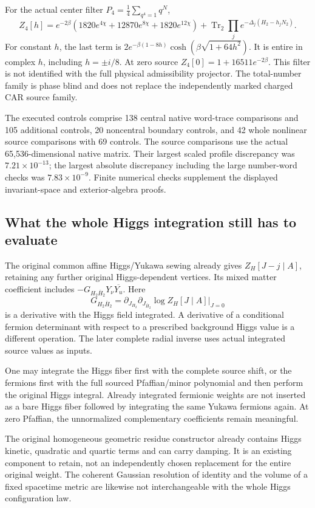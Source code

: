 For the actual center filter \(P_4=\frac14\sum_{q^4=1}q^N\),
\[
 Z_4[h]=e^{-2\beta}\left(1820e^{4\chi}+12870e^{8\chi}
                   +1820e^{12\chi}\right)
       +\operatorname{Tr}_2\prod_j e^{-\Delta_j(H_2-h_jN_2)}.
\]
For constant \(h\), the last term is
\(2e^{-\beta(1-8h)}\cosh(\beta\sqrt{1+64h^2})\).
It is entire in complex \(h\), including \(h=\pm i/8\).
At zero source \(Z_4[0]=1+16511e^{-2\beta}\).
This filter is not identified with the full physical admissibility
projector. The total-number family is phase blind and does not replace
the independently marked charged CAR source family.

The executed controls comprise 138 central native word-trace comparisons
and 105 additional controls, 20 noncentral boundary controls, and 42
whole nonlinear source comparisons with 69 controls. The source
comparisons use the actual 65,536-dimensional native matrix. Their
largest scaled profile discrepancy was \(7.21\times10^{-13}\);
the largest absolute discrepancy including the large number-word
checks was \(7.83\times10^{-9}\). Finite numerical checks supplement
the displayed invariant-space and exterior-algebra proofs.

\subsection*{What the whole Higgs integration still has to evaluate}
The original common affine Higgs/Yukawa sewing already gives
\(Z_H[J-j\mid A]\), retaining any further original Higgs-dependent
vertices. Its mixed matter coefficient includes
\(-G_{H_2\bar H_2}Y_\nu\overline{Y_u}\). Here
\[
 G_{H_2\bar H_2}
 =\partial_{J_{H_2}}\partial_{J_{\bar H_2}}
                  \log Z_H[J\mid A]\big|_{J=0}
\]
is a derivative with the Higgs field integrated. A derivative of a
conditional fermion determinant with respect to a prescribed background
Higgs value is a different operation. The later complete radial inverse
uses actual integrated source values as inputs.

One may integrate the Higgs fiber first with the complete source shift,
or the fermions first with the full sourced Pfaffian/minor polynomial
and then perform the original Higgs integral. Already integrated
fermionic weights are not inserted as a bare Higgs fiber followed by
integrating the same Yukawa fermions again. At zero Pfaffian, the
unnormalized complementary coefficients remain meaningful.

The original homogeneous geometric residue constructor already contains
Higgs kinetic, quadratic and quartic terms and can carry damping.
It is an existing component to retain, not an independently chosen
replacement for the entire original weight. The coherent Gaussian
resolution of identity and the volume of a fixed spacetime metric
are likewise not interchangeable with the whole Higgs configuration law.

